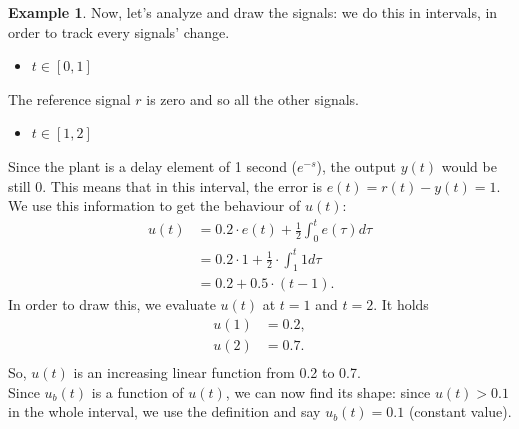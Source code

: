 \documentclass[a4paper,12 pt]{article}
\numberwithin{equation}{section}
\theoremstyle{definition}
\newtheorem{bsp}{Example}
\theoremstyle{remark}
\theoremstyle{definition}
\theoremstyle{definition}
\theoremstyle{definition}
\theoremstyle{remark}
\begin{document}
\begin{bsp}
Now, let's analyze and draw the signals: we do this in intervals, in order to track every signals' change.
\begin{itemize}
\item $t\in [0,1]$
\end{itemize}
The reference signal $r$ is zero and so all the other signals.
\begin{itemize}
\item $t\in [1,2]$
\end{itemize}
Since the plant is a delay element of 1 second ($e^{-s}$), the output $y(t)$ would be still 0. This means that in this interval, the error is $e(t)=r(t)-y(t)=1$. We use this information to get the behaviour of $u(t)$:
\begin{equation*}
\begin{split}
u(t)&=0.2\cdot e(t) +\frac{1}{2} \int_0^te(\tau)d\tau\\
&=0.2\cdot 1 + \frac{1}{2} \cdot \int_1^t 1 d \tau\\
&= 0.2+ 0.5 \cdot (t-1).
\end{split}
\end{equation*}
In order to draw this, we evaluate $u(t)$ at $t=1$ and $t=2$. It holds
\begin{equation*}
\begin{split}
u(1)&=0.2,\\
u(2)&=0.7.\\
\end{split}
\end{equation*}
So, $u(t)$ is an increasing linear function from 0.2 to 0.7. \\
Since $u_b(t)$ is a function of $u(t)$, we can now find its shape: since $u(t)>0.1$ in the whole interval, we use the definition and say $u_b(t)=0.1$ (constant value).


\end{bsp}
\end{document}
